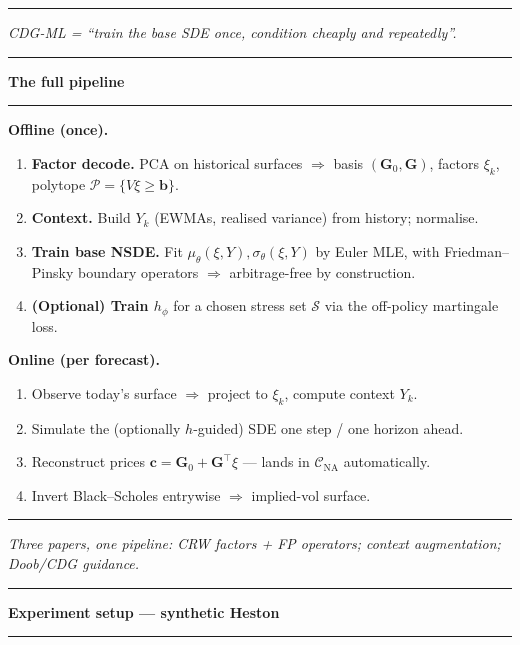 \documentclass[12pt]{article}
\newcommand{\slide}[1]{%
  \par\noindent\rule{\linewidth}{1.2pt}\par\vspace{2pt}%
  {\LARGE\bfseries #1}\par\vspace{2pt}%
  \noindent\rule{\linewidth}{0.5pt}\par\vspace{8pt}}
\newcommand{\footer}[1]{\vfill\noindent\rule{\linewidth}{0.3pt}\par
  {\small\itshape #1}}
\newcommand{\cP}{\mathcal{P}}
\newcommand{\cS}{\mathcal{S}}
\newcommand{\cC}{\mathcal{C}}
\begin{document}
\footer{CDG-ML = ``train the base SDE once, condition cheaply and repeatedly''.}
\clearpage

\slide{The full pipeline}

\textbf{Offline (once).}
\begin{enumerate}
\item \textbf{Factor decode.} PCA on historical surfaces $\Rightarrow$
  basis $(\mathbf G_0,\mathbf G)$, factors $\xi_k$, polytope
  $\cP=\{V\xi\ge \mathbf b\}$.
\item \textbf{Context.} Build $Y_k$ (EWMAs, realised variance) from history;
  normalise.
\item \textbf{Train base NSDE.} Fit $\mu_\theta(\xi,Y),\sigma_\theta(\xi,Y)$
  by Euler MLE, with Friedman--Pinsky boundary operators $\Rightarrow$
  arbitrage-free by construction.
\item \textbf{(Optional) Train $h_\phi$} for a chosen stress set $\cS$ via
  the off-policy martingale loss.
\end{enumerate}

\textbf{Online (per forecast).}
\begin{enumerate}
\item Observe today's surface $\Rightarrow$ project to $\xi_k$, compute
  context $Y_k$.
\item Simulate the (optionally $h$-guided) SDE one step / one horizon ahead.
\item Reconstruct prices $\mathbf c=\mathbf G_0+\mathbf G^\top\xi$ --- lands
  in $\cC_{\mathrm{NA}}$ automatically.
\item Invert Black--Scholes entrywise $\Rightarrow$ implied-vol surface.
\end{enumerate}

\vspace{6pt}
\begin{center}
\end{center}

\footer{Three papers, one pipeline: CRW factors + FP operators; context augmentation; Doob/CDG guidance.}
\clearpage

\slide{Experiment setup --- synthetic Heston}
\end{document}
